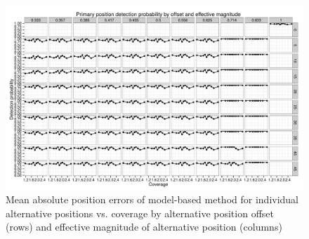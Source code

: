 \begin{figure}
\includegraphics[page=13,width=0.95\textheight]{figures/nucleosomes/plots_power_pm3}
\caption{Mean absolute position errors of model-based method for individual alternative positions vs. coverage by alternative position offset (rows) and effective magnitude of alternative position (columns)}
\end{figure}

